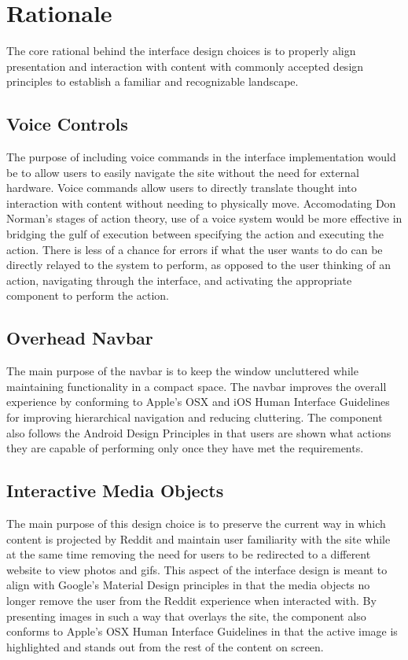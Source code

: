 \documentclass{article}
\begin{document}
\section{Rationale} The core rational behind the interface design choices is to properly align presentation and interaction with content with commonly accepted design principles to establish a familiar and recognizable landscape.

\subsection{Voice Controls} The purpose of including voice commands in the interface implementation would be to allow users to easily navigate the site without the need for external hardware. Voice commands allow users to directly translate thought into interaction with content without needing to physically move. Accomodating Don Norman's stages of action theory, use of a voice system would be more effective in bridging the gulf of execution between specifying the action and executing the action. There is less of a chance for errors if what the user wants to do can be directly relayed to the system to perform, as opposed to the user thinking of an action, navigating through the interface, and activating the appropriate component to perform the action.

\subsection{Overhead Navbar} The main purpose of the navbar is to keep the window uncluttered while maintaining functionality in a compact space. The navbar improves the overall experience by conforming to Apple's OSX and iOS Human Interface Guidelines for improving hierarchical navigation and reducing cluttering\cite{OSX, iOS}. The component also follows the Android Design Principles in that users are shown what actions they are capable of performing only once they have met the requirements\cite{Android}.

\subsection{Interactive Media Objects} The main purpose of this design choice is to preserve the current way in which content is projected by Reddit and maintain user familiarity with the site while at the same time removing the need for users to be redirected to a different website to view photos and gifs. This aspect of the interface design is meant to align with Google's Material Design principles in that the media objects no longer remove the user from the Reddit experience when interacted with\cite{Google}. By presenting images in such a way that overlays the site, the component also conforms to Apple's OSX Human Interface Guidelines in that the active image is highlighted and stands out from the rest of the content on screen\cite{OSX}.
\end{document}
